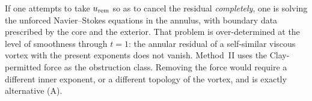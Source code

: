 \begin{remark}
If one attempts to take $u_{\mathrm{rem}}$ so as to cancel the residual \emph{completely}, one is solving the unforced {N}avier--{S}tokes equations in the annulus, with boundary data prescribed by the core and the exterior. That problem is over-determined at the level of smoothness through $t=1$: the annular residual of a self-similar viscous vortex with the present exponents does not vanish. Method~II uses the {C}lay-permitted force as the obstruction class. Removing the force would require a different inner exponent, or a different topology of the vortex, and is exactly alternative (A).
\end{remark}
